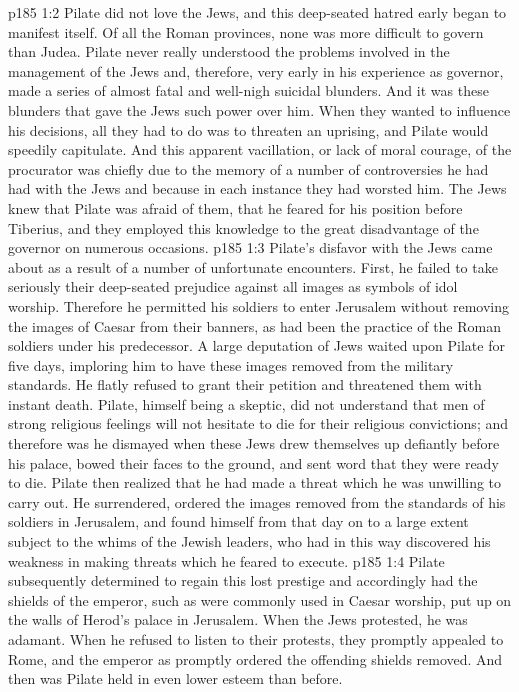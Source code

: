 \vs p185 1:2 Pilate did not love the Jews, and this deep\hyp{}seated hatred early began to manifest itself. Of all the Roman provinces, none was more difficult to govern than Judea. Pilate never really understood the problems involved in the management of the Jews and, therefore, very early in his experience as governor, made a series of almost fatal and well\hyp{}nigh suicidal blunders. And it was these blunders that gave the Jews such power over him. When they wanted to influence his decisions, all they had to do was to threaten an uprising, and Pilate would speedily capitulate. And this apparent vacillation, or lack of moral courage, of the procurator was chiefly due to the memory of a number of controversies he had had with the Jews and because in each instance they had worsted him. The Jews knew that Pilate was afraid of them, that he feared for his position before Tiberius, and they employed this knowledge to the great disadvantage of the governor on numerous occasions.
\vs p185 1:3 Pilate’s disfavor with the Jews came about as a result of a number of unfortunate encounters. First, he failed to take seriously their deep\hyp{}seated prejudice against all images as symbols of idol worship. Therefore he permitted his soldiers to enter Jerusalem without removing the images of Caesar from their banners, as had been the practice of the Roman soldiers under his predecessor. A large deputation of Jews waited upon Pilate for five days, imploring him to have these images removed from the military standards. He flatly refused to grant their petition and threatened them with instant death. Pilate, himself being a skeptic, did not understand that men of strong religious feelings will not hesitate to die for their religious convictions; and therefore was he dismayed when these Jews drew themselves up defiantly before his palace, bowed their faces to the ground, and sent word that they were ready to die. Pilate then realized that he had made a threat which he was unwilling to carry out. He surrendered, ordered the images removed from the standards of his soldiers in Jerusalem, and found himself from that day on to a large extent subject to the whims of the Jewish leaders, who had in this way discovered his weakness in making threats which he feared to execute.
\vs p185 1:4 Pilate subsequently determined to regain this lost prestige and accordingly had the shields of the emperor, such as were commonly used in Caesar worship, put up on the walls of Herod’s palace in Jerusalem. When the Jews protested, he was adamant. When he refused to listen to their protests, they promptly appealed to Rome, and the emperor as promptly ordered the offending shields removed. And then was Pilate held in even lower esteem than before.
